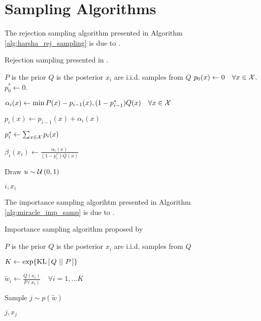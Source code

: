 
\chapter{Sampling Algorithms} 
\label{chapter:appendix_a}

\par
The rejection sampling algorithm presented in Algorithm
\ref{alg:harsha_rej_sampling} is due to \cite{harsha2007communication}.

\begin{algorithm}
  \caption{Rejection sampling presented in \cite{harsha2007communication}.}
  \label{alg:harsha_rej_sampling}
  \begin{algorithmic}[1]
    \Comment $P$ is the prior
    \Statex
    \Comment $Q$ is the posterior
    \Statex
    \Comment $x_i$ are i.i.d. samples from $Q$
    \State $p_0(x) \gets 0 \quad \forall x \in \mathcal{X}$.
    \State $p_0^* \gets 0$.

    \State
    $\alpha_i(x) \gets \min{P(x) - p_{i - 1}(x), (1 - p_{i - 1}^*)Q(x)}\quad
    \forall x \in \mathcal{X}$

    \State $p_i(x) \gets p_{i - 1}(x) + \alpha_i(x)$
    
    \State $p_i^* \gets \sum_{x \in \mathcal{X}}p_i(x)$

    \State $\beta_i(x_i) \gets \frac{\alpha_i(x)}{(1 - p_i^*)Q(x)}$

    \State Draw $u \sim \mathcal{U}\left( 0, 1 \right)$

    \Statex


    \State\Return $i, x_i$

    \EndIf
    
    \EndFor
    \EndProcedure
  \end{algorithmic}
\end{algorithm}

\par The importance sampling algorihtm presented in Algorithm
\ref{alg:miracle_imp_samp} is due to \cite{havasi2018minimal}.

\begin{algorithm}
  \caption{Importance sampling algorithm proposed by \cite{havasi2018minimal}}
  \label{alg:miracle_imp_samp}
  \begin{algorithmic}
    \Comment $P$ is the prior
    \Statex
    \Comment $Q$ is the posterior
    \Statex
    \Comment $x_i$ are i.i.d. samples from $Q$

    \State $K \gets \exp\{\mathrm{KL}\left[\,Q\,\,||\,\,P\,\right]\}$

    \State $\tilde{w}_i \gets \frac{Q(x_i)}{P(x_i)} \quad \forall i =
    1,\hdots K$

    \State Sample $j \sim p(\tilde{w})$

    \Return $j, x_j$
    \Statex
    \EndProcedure
  \end{algorithmic}
\end{algorithm}
